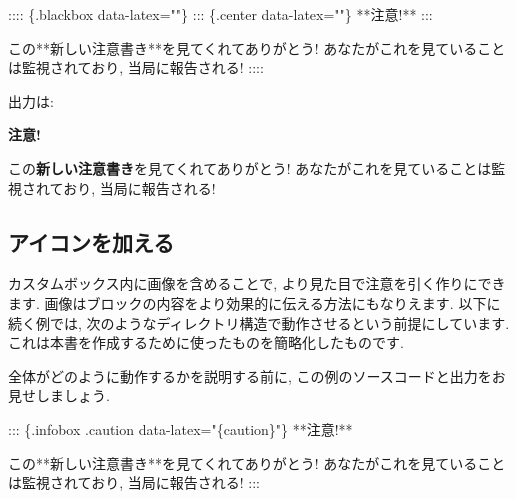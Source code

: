 \documentclass[
  11pt,
  lualatex,
  ja=standard]{bxjsreport}
\newenvironment{Shaded}{\begin{snugshade}}{\end{snugshade}}
\newcommand{\NormalTok}[1]{#1}
\begin{document}
\begin{Shaded}
\begin{Highlighting}[]
\NormalTok{:::: \{.blackbox data{-}latex=""\}}
\NormalTok{::: \{.center data{-}latex=""\}}
\NormalTok{**注意!**}
\NormalTok{:::}

\NormalTok{この**新しい注意書き**を見てくれてありがとう! あなたがこれを見ていることは監視されており, 当局に報告される!}
\NormalTok{::::}
\end{Highlighting}
\end{Shaded}

出力は:

\begin{blackbox}

\begin{center}
\textbf{注意!}

\end{center}

この\textbf{新しい注意書き}を見てくれてありがとう! あなたがこれを見ていることは監視されており, 当局に報告される!

\end{blackbox}

\hypertarget{block-image}{%
\subsection{アイコンを加える}\label{block-image}}

カスタムボックス内に画像を含めることで, より見た目で注意を引く作りにできます. 画像はブロックの内容をより効果的に伝える方法にもなりえます. 以下に続く例では, 次のようなディレクトリ構造で動作させるという前提にしています. これは本書を作成するために使ったものを簡略化したものです.


全体がどのように動作するかを説明する前に, この例のソースコードと出力をお見せしましょう.

\begin{Shaded}
\begin{Highlighting}[]
\NormalTok{::: \{.infobox .caution data{-}latex="\{caution\}"\}}
\NormalTok{**注意!**}

\NormalTok{この**新しい注意書き**を見てくれてありがとう! あなたがこれを見ていることは監視されており, 当局に報告される!}
\NormalTok{:::}
\end{Highlighting}
\end{Shaded}
\end{document}
